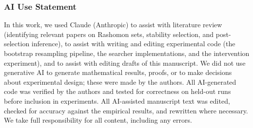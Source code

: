 \documentclass[twoside]{article}
\begin{document}
\subsubsection*{AI Use Statement}

In this work, we used Claude (Anthropic) to assist with literature
review (identifying relevant papers on Rashomon sets, stability
selection, and post-selection inference), to assist with writing and
editing experimental code (the bootstrap resampling pipeline, the
searcher implementations, and the intervention experiment), and to
assist with editing drafts of this manuscript.
We did not use generative AI to generate mathematical results,
proofs, or to make decisions about experimental design; these were
made by the authors.
All AI-generated code was verified by the authors and tested for
correctness on held-out runs before inclusion in experiments.
All AI-assisted manuscript text was edited, checked for accuracy
against the empirical results, and rewritten where necessary.
We take full responsibility for all content, including any errors.
\end{document}
